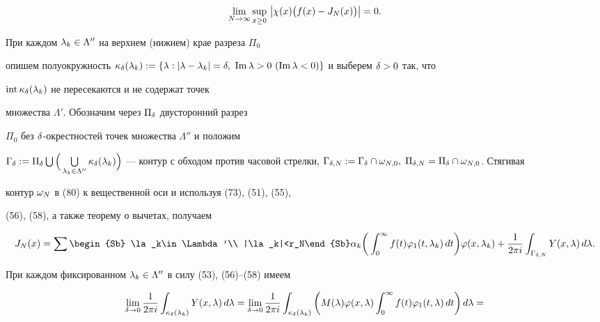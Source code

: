 \begin{pf}
\begin{equation}
\lim_{N\to\iy}\sup_{x\ge 0}\,


\big|\chi(x)\big(f(x)-J_N(x)\big)\big|=0.


\end{equation}


При каждом $\lambda_k\in\Lambda''$ на верхнем (нижнем) крае разреза $\Pi_0$


опишем полуокружность $\kappa_{\de}(\la_k):=\{\la:|\la-\la_k|=\de,\


\im \la>0\ (\im\la<0)\}$ и выберем $\de>0$ так, что


$\mathrm{int}\,\kappa_{\delta}(\lambda_k)$ не пересекаются и не содержат точек


множества $\Lambda'$. Обозначим через $\Pi_\delta$ двусторонний разрез


$\Pi_0$ без $\delta$-окрестностей точек множества $\Lambda''$ и положим


$\Gamma_\de:=\Pi_\de


\bigcup\Big(\bigcup\limits_{\la_k\in\Lambda''}\kappa_{\de}


(\la_k)\Big)$ --- контур с обходом против часовой стрелки, $\Gamma_{\de,N}:=


\Gamma_\de\cap\om_{N,0},\;\Pi_{\de,N}=\Pi_{\de}\cap\om_{N,0}$. Стягивая


контур $\omega_N$ в (80) к вещественной оси и используя (73), (51), (55),


(56), (58), а также теорему о вычетах, получаем


\begin{equation}


J_N(x)=\sum\begin{Sb} \la_k\in\Lambda'\\ |\la_k|<r_N\end{Sb} \al _k


\bigg(\int_0^\iy f(t)\vv_1(t,\la_k)\,dt\bigg)\vv(x,\la_k) +


\frac 1{2\pi i}\int_{\Gamma_{\de,N}} Y(x,\la)\,d\la.


\end{equation}


При каждом фиксированном $\lambda_k\in\Lambda''$ в силу (53), (56)--(58) имеем


\begin{multline*}


\lim_{\de\to 0} \frac 1{2\pi i}\int_{\kappa_{\de}(\la_k)} Y(x,\la)\,d\la


=\lim_{\de\to 0} \frac 1{2\pi i}\int_{\kappa_{\de}(\la_k)}


\bigg(M(\la)\vv(x,\la)\int_0^\iy f(t)\vv_1(t,\la)\,dt\bigg)\,d\la = \\



\end{multline*}
\end{pf}
